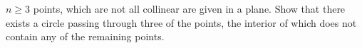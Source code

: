 $n \geq 3$ points, which are not all collinear are given in a plane. Show that there exists a circle passing through three of the points, the interior of which does not contain any of the remaining points.
